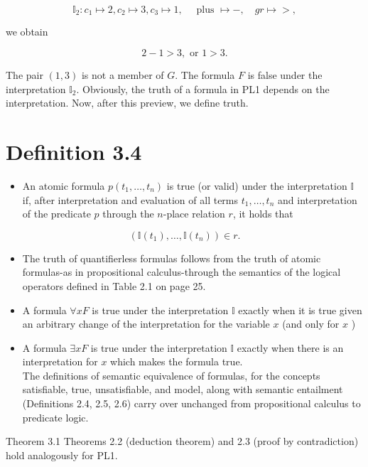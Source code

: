 \documentclass[10pt]{book}
\begin{document}
$$
\mathbb{I}_{2}: c_{1} \mapsto 2, c_{2} \mapsto 3, c_{3} \mapsto 1, \quad \text { plus } \mapsto-, \quad g r \mapsto>,
$$

we obtain

$$
2-1>3, \text { or } 1>3 .
$$

The pair $(1,3)$ is not a member of $G$. The formula $F$ is false under the interpretation $\mathbb{I}_{2}$. Obviously, the truth of a formula in PL1 depends on the interpretation. Now, after this preview, we define truth.

\section*{Definition 3.4}
\begin{itemize}
  \item An atomic formula $p\left(t_{1}, \ldots, t_{n}\right)$ is true (or valid) under the interpretation $\mathbb{I}$ if, after interpretation and evaluation of all terms $t_{1}, \ldots, t_{n}$ and interpretation of the predicate $p$ through the $n$-place relation $r$, it holds that
\end{itemize}


$$
\left(\mathbb{I}\left(t_{1}\right), \ldots, \mathbb{I}\left(t_{n}\right)\right) \in r .
$$

\begin{itemize}
  \item The truth of quantifierless formulas follows from the truth of atomic formulas-as in propositional calculus-through the semantics of the logical operators defined in Table 2.1 on page 25.
  \item A formula $\forall x F$ is true under the interpretation $\mathbb{I}$ exactly when it is true given an arbitrary change of the interpretation for the variable $x$ (and only for $x$ )
  \item A formula $\exists x F$ is true under the interpretation $\mathbb{I}$ exactly when there is an interpretation for $x$ which makes the formula true.\\
The definitions of semantic equivalence of formulas, for the concepts satisfiable, true, unsatisfiable, and model, along with semantic entailment (Definitions 2.4, 2.5, 2.6) carry over unchanged from propositional calculus to predicate logic.
\end{itemize}

Theorem 3.1 Theorems 2.2 (deduction theorem) and 2.3 (proof by contradiction) hold analogously for PL1.
\end{document}
